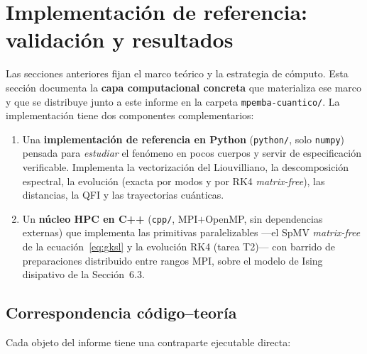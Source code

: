 \documentclass[11pt,a4paper]{article}
\theoremstyle{definition}
\theoremstyle{plain}
\begin{document}
\section{Implementación de referencia: validación y resultados}

Las secciones anteriores fijan el marco teórico y la estrategia de cómputo. Esta
sección documenta la \textbf{capa computacional concreta} que materializa ese
marco y que se distribuye junto a este informe en la carpeta
\texttt{mpemba-cuantico/}. La implementación tiene dos componentes
complementarios:
\begin{enumerate}[leftmargin=1.6em,itemsep=2pt]
\item Una \textbf{implementación de referencia en Python} (\texttt{python/}, solo
\texttt{numpy}) pensada para \emph{estudiar} el fenómeno en pocos cuerpos y servir
de especificación verificable. Implementa la vectorización del Liouvilliano, la
descomposición espectral, la evolución (exacta por modos y por RK4
\emph{matrix-free}), las distancias, la QFI y las trayectorias cuánticas.
\item Un \textbf{núcleo HPC en C++} (\texttt{cpp/}, MPI${+}$OpenMP, sin
dependencias externas) que implementa las primitivas paralelizables ---el SpMV
\emph{matrix-free} de la ecuación~\eqref{eq:gksl} y la evolución RK4 (tarea
T2)--- con barrido de preparaciones distribuido entre rangos MPI, sobre el modelo
de Ising disipativo de la Sección~6.3.
\end{enumerate}

\subsection{Correspondencia código--teoría}

Cada objeto del informe tiene una contraparte ejecutable directa:
\end{document}
